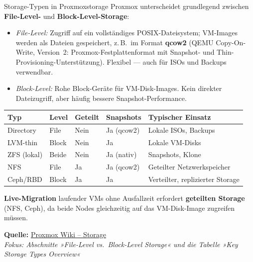 \documentclass[a4paper,10pt,addpoints]{exam}
\begin{document}
\begin{infoBox}{Storage-Typen in Proxmox}{storage}
  Proxmox unterscheidet grundlegend zwischen \textbf{File-Level-} und
  \textbf{Block-Level-Storage}:
  \begin{itemize}
    \item \emph{File-Level:} Zugriff auf ein vollständiges POSIX-Dateisystem;
      VM-Images werden als Dateien gespeichert, z.\,B.\ im Format
      \textbf{qcow2} (QEMU Copy-On-Write, Version~2: Proxmox-Festplattenformat
      mit Snapshot- und Thin-Provisioning-Unterstützung).
      Flexibel --- auch für ISOs und Backups verwendbar.
    \item \emph{Block-Level:} Rohe Block-Geräte für VM-Disk-Images.
      Kein direkter Dateizugriff, aber häufig bessere Snapshot-Performance.
  \end{itemize}

  \medskip
  \renewcommand{\arraystretch}{1.3}
  \begin{tabularx}{\textwidth}{llllX}
    \toprule
    \textbf{Typ}  & \textbf{Level} & \textbf{Geteilt} & \textbf{Snapshots} & \textbf{Typischer Einsatz} \\
    \midrule
    Directory     & File    & Nein & Ja (qcow2) & Lokale ISOs, Backups \\
    LVM-thin      & Block   & Nein & Ja         & Lokale VM-Disks \\
    ZFS (lokal)   & Beide   & Nein & Ja (nativ) & Snapshots, Klone \\
    NFS           & File    & Ja   & Ja (qcow2) & Geteilter Netzwerkspeicher \\
    Ceph/RBD      & Block   & Ja   & Ja         & Verteilter, replizierter Storage \\
    \bottomrule
  \end{tabularx}
  \renewcommand{\arraystretch}{1}

  \medskip
  \textbf{Live-Migration} laufender VMs ohne Ausfallzeit erfordert
  \textbf{geteilten Storage} (NFS, Ceph), da beide Nodes gleichzeitig auf das
  VM-Disk-Image zugreifen müssen.

  \medskip\small
  \textbf{Quelle:} \href{https://pve.proxmox.com/wiki/Storage}{Proxmox Wiki -- Storage}\\
  \hspace*{0.4em}\textit{Fokus: Abschnitte »File-Level vs.\ Block-Level Storage«
    und die Tabelle »Key Storage Types Overview«}
\end{infoBox}
\end{document}
